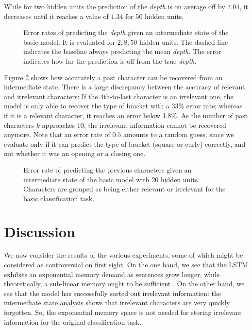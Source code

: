 \documentclass[11pt,a4paper]{article}
\newlength\figureheight
\newlength\figurewidth
\begin{document}
While for two hidden units the prediction of the \emph{depth} is on average off by $7.04$, it decreases until it reaches a value of $1.34$ for 50 hidden units.

\setlength\figureheight{6cm}
\setlength{}
\begin{figure}[ht]
    \caption{Error rates of predicting the \emph{depth} given an intermediate state of the basic model. It is evaluated for $2,8,50$ hidden units. The dashed line indicates the baseline always predicting the mean \emph{depth}. The error indicates how far the prediction is off from the true \emph{depth}.}%
    \label{fig:analysis_depth_results}%
\end{figure}

Figure \ref{fig:analysis_previous_results} shows how accurately a past character can be recovered from an intermediate state. There is a large discrepancy between the accuracy of relevant and irrelevant characters: If the 4th-to-last character is an irrelevant one, the model is only able to recover the type of bracket with a 33\% error rate; whereas if it is a relevant character, it reaches an error below 1.8\%. As the number of past characters $k$ approaches 10, the irrelevant information cannot be recovered anymore. Note that an error rate of $0.5$ amounts to a random guess, since we evaluate only if it can predict the type of bracket (square or curly) correctly, and not whether it was an opening or a closing one.

\setlength\figureheight{4cm}
\setlength\figurewidth{\linewidth}
\begin{figure}[ht]
    \caption{Error rate of predicting the previous characters given an intermediate state of the basic model with 20 hidden units. Characters are grouped as being either relevant or irrelevant for the basic classification task.}%
    \label{fig:analysis_previous_results}%
\end{figure}

\section{Discussion}

We now consider the results of the various experiments, some of which might be considered as controversial on first sight. On the one hand, we see that the LSTM exhibits an exponential memory demand as sentences grow longer, while theoretically, a sub-linear memory ought to be sufficient \cite{magniez2014recognizing}. On the other hand, we see that the model has successfully sorted out irrelevant information: the intermediate state analysis shows that irrelevant characters are very quickly forgotten. So, the exponential memory space is not needed for storing irrelevant information for the original classification task.
\end{document}
